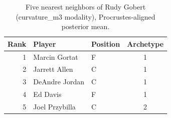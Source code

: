 \begin{table}[htbp]
  \centering\small
  \begin{tabular}{rllc}
    \toprule
    Rank & Player & Position & Archetype \\
    \midrule
    1 & Marcin Gortat & F & 1 \\
    2 & Jarrett Allen & C & 1 \\
    3 & DeAndre Jordan & C & 1 \\
    4 & Ed Davis & F & 1 \\
    5 & Joel Przybilla & C & 2 \\
    \bottomrule
  \end{tabular}
  \caption{Five nearest neighbors of Rudy Gobert (curvature_m3 modality), Procrustes-aligned posterior mean.}
  \label{tab:Rudy_Gobert_neighbors_curvature_m3}
\end{table}

